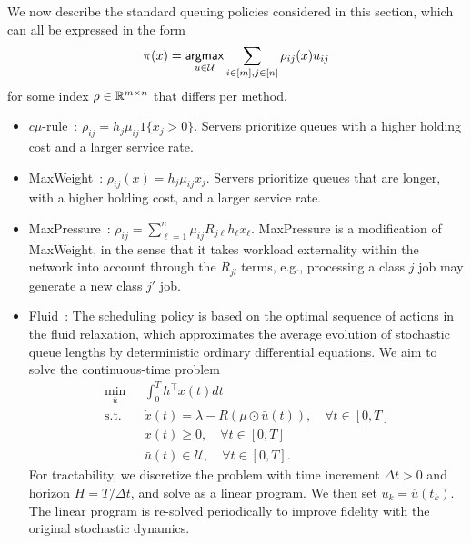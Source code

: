 We now describe the standard queuing policies considered in this section, which can all be expressed in the form
\[
    \pi(x)=\mathop{\mathsf{argmax}}_{u\in \mathcal{U}} \sum_{i\in[m],j\in[n]} \rho_{ij}(x)u_{ij}
    \]
for some index $\rho\in \mathbb{R}^{m \times n}$ that differs per method.
\begin{itemize}[itemsep=0pt]
    \item $c\mu$-rule~\cite{cox1961queues}: $\rho_{ij} = h_{j}\mu_{ij}1\{x_{j} > 0 \}$. Servers prioritize queues with a higher holding cost and a larger service rate.
    \item MaxWeight~\cite{tassiulas1990stability, stolyar2004maxweight}: $\rho_{ij}(x) = h_{j}\mu_{ij}x_{j}$. Servers prioritize queues that are longer, with a higher holding cost, and a larger service rate.
    \item MaxPressure~\cite{tassiulas1990stability,dai2005maximum}: $\rho_{ij}= \sum_{\ell=1}^{n}\mu_{ij}R_{j\ell}h_{\ell}x_{\ell}$. MaxPressure is a modification of MaxWeight, in the sense that it takes workload externality within the network into account through the $R_{jl}$ terms, e.g., processing a class $j$ job may generate a new class $j'$ job. 
    \item Fluid~\cite{bauerle2000asymptotic}: The scheduling policy is based on the optimal sequence of actions in the fluid relaxation, which approximates the average evolution of stochastic queue lengths by deterministic ordinary differential equations. We aim to solve the continuous-time problem
    \begin{align*}
    \min_{\bar{u}}\text{ } & \int_{0}^{T} h^\top x(t)dt \\
    \text{s.t. } & \dot{x}(t) = \lambda - R(\mu \odot \bar{u}(t)), \quad  \forall t\in [0,T]\\
    & x(t) \geq 0, \quad \forall t\in [0,T] \\
    & \bar{u}(t) \in \overline{\mathcal{U}}, \quad \forall t\in [0,T].
    \end{align*}
    For tractability, we discretize the problem with time increment $\Delta t > 0$ and horizon $H=T/\Delta t$, and solve as a linear program.
    We then set $u_{k} = \overline{u}(t_{k})$. The linear program is re-solved periodically to improve fidelity with the original stochastic dynamics.
\end{itemize}
